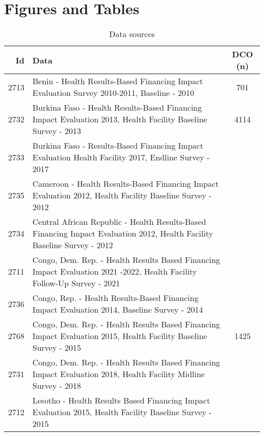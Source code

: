 \documentclass{article}
\begin{document}
\section*{Figures and Tables}
\begin{table}[ht]
\centering
\begin{tabular}{@{}r >{\raggedright\arraybackslash}p{10cm} c@{}}
\toprule
\textbf{Id} & \textbf{Data} & \textbf{DCO (n)} \\
\midrule
2713 & Benin - Health Results-Based Financing Impact Evaluation Survey 2010-2011, Baseline - 2010 & 701\\
2732 & Burkina Faso - Health Results-Based Financing Impact Evaluation 2013, Health Facility Baseline Survey - 2013 & 4114\\
2733 & Burkina Faso - Results-Based Financing Impact Evaluation Health Facility 2017, Endline Survey - 2017 & \\
2735 & Cameroon - Health Results-Based Financing Impact Evaluation 2012, Health Facility Baseline Survey - 2012 & \\
2734 & Central African Republic - Health Results-Based Financing Impact Evaluation 2012, Health Facility Baseline Survey - 2012 & \\
2711 & Congo, Dem. Rep. - Health Results Based Financing Impact Evaluation 2021 -2022, Health Facility Follow-Up Survey - 2021 & \\
2736 & Congo, Rep. - Health Results-Based Financing Impact Evaluation 2014, Baseline Survey - 2014 & \\
2768 & Congo, Dem. Rep. - Health Results Based Financing Impact Evaluation 2015, Health Facility Baseline Survey - 2015 & 1425 \\
2731 & Congo, Dem. Rep. - Health Results Based Financing Impact Evaluation 2018, Health Facility Midline Survey - 2018 & \\
2712 & Lesotho - Health Results Based Financing Impact Evaluation 2015, Health Facility Baseline Survey - 2015 & \\
\bottomrule
\end{tabular}
\caption{Data sources}
\label{tab:data sources}
\end{table}
\end{document}
